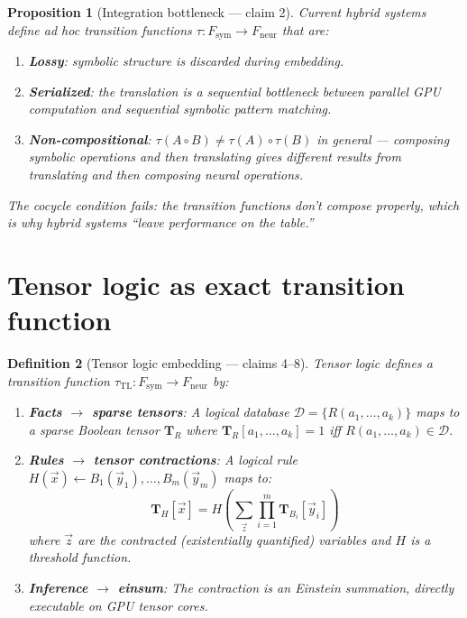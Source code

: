 \documentclass[11pt,a4paper]{article}
\newtheorem{definition}{Definition}[section]
\newtheorem{proposition}[definition]{Proposition}
\begin{document}
\begin{proposition}[Integration bottleneck --- claim 2]
\label{prop:bottleneck}
Current hybrid systems define ad hoc transition functions
$\tau : F_{\text{sym}} \to F_{\text{neur}}$ that are:
\begin{enumerate}
\item \textbf{Lossy}: symbolic structure is discarded during embedding.
\item \textbf{Serialized}: the translation is a sequential bottleneck
  between parallel GPU computation and sequential symbolic pattern
  matching.
\item \textbf{Non-compositional}: $\tau(A \circ B) \neq \tau(A) \circ \tau(B)$
  in general --- composing symbolic operations and then translating
  gives different results from translating and then composing neural
  operations.
\end{enumerate}
The cocycle condition fails: the transition functions don't compose
properly, which is why hybrid systems ``leave performance on the table.''
\end{proposition}

\section{Tensor logic as exact transition function}
\label{sec:tensor-logic}

\begin{definition}[Tensor logic embedding --- claims 4--8]
\label{def:tensor-embed}
Tensor logic defines a transition function
$\tau_{\text{TL}} : F_{\text{sym}} \to F_{\text{neur}}$ by:
\begin{enumerate}
\item \textbf{Facts $\to$ sparse tensors}: A logical database
  $\mathcal{D} = \{R(a_1, \ldots, a_k)\}$ maps to a sparse Boolean
  tensor $\mathbf{T}_R$ where $\mathbf{T}_R[a_1, \ldots, a_k] = 1$
  iff $R(a_1, \ldots, a_k) \in \mathcal{D}$.
\item \textbf{Rules $\to$ tensor contractions}: A logical rule
  $H(\vec{x}) \leftarrow B_1(\vec{y}_1), \ldots, B_m(\vec{y}_m)$
  maps to:
  \[
    \mathbf{T}_H[\vec{x}] = H\!\left(
      \sum_{\vec{z}} \prod_{i=1}^m \mathbf{T}_{B_i}[\vec{y}_i]
    \right)
  \]
  where $\vec{z}$ are the contracted (existentially quantified)
  variables and $H$ is a threshold function.
\item \textbf{Inference $\to$ einsum}: The contraction is an Einstein
  summation, directly executable on GPU tensor cores.
\end{enumerate}
\end{definition}
\end{document}
